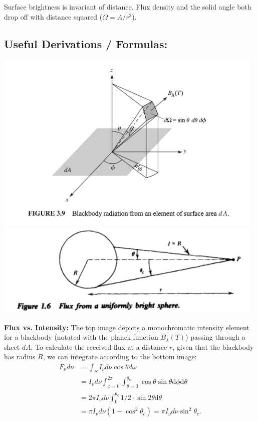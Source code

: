 \documentclass[12pt]{article}
\begin{document}
Surface brightness is invariant of distance. Flux density and the solid angle both drop off with distance squared ($\Omega = A/r^2$).

\subsection{Useful Derivations / Formulas:}

\begin{center}
    \includegraphics[width=13cm]{images/intensity.png}
    \includegraphics[width=13cm]{images/fluxdistance.png}
\end{center}

\textbf{Flux vs. Intensity:}\newline
The top image depicts a monochromatic intensity element for a blackbody (notated with the planck function $B_{\lambda}(T)$) passing through a sheet $dA$. To calculate the received flux at a distance $r$, given that the blackbody has radius $R$, we can integrate according to the bottom image:
\begin{align*}
F_{\nu}d\nu &= \int_S I_{\nu}d\nu\cos{\theta}d\omega \\
&= I_{\nu}d\nu \int_{\phi = 0}^{2\pi}\int_{\theta = 0}^{\theta_c}\cos{\theta}\sin{\theta}\mathrm{d}\phi \mathrm{d}\theta \\
&= 2\pi I_{\nu}d\nu\int_{0}^{\theta_c}1/2\cdot \sin{2\theta}\mathrm{d}\theta \\
&= \pi I_{\nu}d\nu (1-\cos^2{\theta_c}) = \pi I_{\nu}d\nu \sin^2{\theta_c}.
\end{align*}
\end{document}
